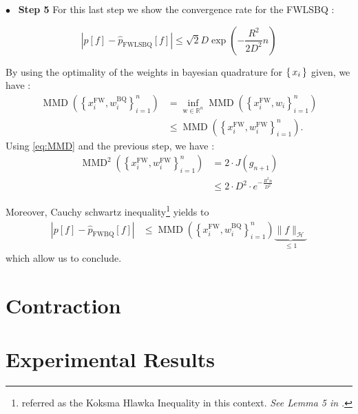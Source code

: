   {$\bullet$~\normalfont\bfseries\color{myorange!90!black} Step 5 }
For this last step we show the convergence rate for the FWLSBQ :
\begin{boxtheorem}
  \begin{equation}
    \left| p [ f ] - \hat { p } _ { \mathrm { FWLSBQ } } [ f ] \right| \leq
    \sqrt { 2 } D \exp \left( - \frac { R ^ { 2 } } { 2 D ^ { 2 } } n \right)
  \end{equation}
\end{boxtheorem}

By using the optimality of the weights in bayesian quadrature for $\left \{ \, x_i \, \right \}$ given,
 we have :
 \begin{align*}
   \operatorname { MMD } \left( \left\{ x _ { i } ^ { \mathrm { FW } } , w _ { i } ^ { \mathrm { BQ } } \right\} _ { i = 1 } ^ { n } \right) &= \inf _ { \mathrm { w } \in \mathbb { R } ^ { n } } \operatorname { MMD } \left( \left\{ x _ { i } ^ { \mathrm { FW } } , w _ { i } \right\} _ { i = 1 } ^ { n } \right) \\
   & \leq \operatorname { MMD } \left( \left\{ x _ { i } ^ { \mathrm { FW } } , w _ { i } ^ { \mathrm { FW } } \right\} _ { i = 1 } ^ { n } \right).
 \end{align*}
Using \eqref{eq:MMD} and the previous step, we have :
\begin{align*}
  \operatorname { MMD } ^ { 2 } \left( \left\{ x _ { i } ^ { \mathrm { FW } } , w _ { i } ^ { \mathrm { FW } } \right\} _ { i = 1 } ^ { n } \right)
  &= 2 \cdot J(g_{n+1}) \\
  &\leq 2 \cdot D ^ { 2 } \cdot e ^ { - \frac { R ^ { 2 } n } { D ^ { 2 } } }
\end{align*}

Moreover, Cauchy schwartz inequality\footnote{referred as the Koksma Hlawka Inequality in this context. \textit{See Lemma 5 in \cite{Chen}}.} yields to
\begin{align*}
  \left| p [ f ] - \hat { p } _ { \mathrm { FWBQ } } [ f ] \right| &\leq \operatorname { MMD } \left( \left\{ x _ { i } ^ { \mathrm { FW } } , w _ { i } ^ { \mathrm { BQ } } \right\} _ { i = 1 } ^ { n } \right) \underbrace{\| f \| _ { \mathcal { H }}
   }_{\leq 1}
\end{align*}
which allow us to conclude.
\section{Contraction}
\label{sec:contraction}


\section{Experimental Results}
\label{sec:ER}

